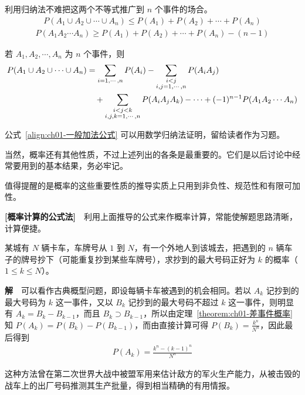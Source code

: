 \documentclass[../../main.tex]{subfiles}
\begin{document}
利用归纳法不难把这两个不等式推广到 $n$ 个事件的场合。
\begin{align*}
P(A_1\cup A_2\cup\cdots\cup A_n)\leqslant P(A_1)+P(A_2)+\cdots+P(A_n)
\end{align*}
\begin{align*}
P(A_1A_2\cdots A_n)\geqslant P(A_1)+P(A_2)+\cdots+P(A_n)-(n-1)
\end{align*}

\begin{theorem}[一般加法公式]\label{theorem:ch01-一般加法公式}
若 $A_1,A_2,\cdots,A_n$ 为 $n$ 个事件，则
\begin{align}
P(A_1\cup A_2\cup\cdots\cup A_n)&=\sum_{i=1,\cdots,n}P(A_i)-\sum_{\substack{i<j\\i,j=1,\cdots,n}}P(A_iA_j)\notag\\
&\quad+\sum_{\substack{i<j<k\\i,j,k=1,\cdots,n}}P(A_iA_jA_k)-\cdots+(-1)^{n-1}P(A_1A_2\cdots A_n)\label{align:ch01-一般加法公式}
\end{align}
\end{theorem}

公式~\eqref{align:ch01-一般加法公式} 可以用数学归纳法证明，留给读者作为习题。

当然，概率还有其他性质，不过上述列出的各条是最重要的。它们是以后讨论中经常要用到的基本结果，务必牢记。

值得提醒的是概率的这些重要性质的推导实质上只用到非负性、规范性和有限可加性。

\textbf{[概率计算的公式法]}~~利用上面推导的公式来作概率计算，常能使解题思路清晰，计算便捷。

\begin{example}[最大车牌号]\label{example:ch01-最大车牌号}
某城有 $N$ 辆卡车，车牌号从 $1$ 到 $N$，有一个外地人到该城去，把遇到的 $n$ 辆车子的牌号抄下（可能重复抄到某些车牌号），求抄到的最大号码正好为 $k$ 的概率（$1\leqslant k\leqslant N$）。

\textbf{解}~~可以看作古典概型问题，即设每辆卡车被遇到的机会相同。若以 $A_k$ 记抄到的最大号码为 $k$ 这一事件，又以 $B_k$ 记抄到的最大号码不超过 $k$ 这一事件，则明显有 $A_k=B_k-B_{k-1}$，而且 $B_k\supset B_{k-1}$，所以由定理~\ref{theorem:ch01-差事件概率} 知 $P(A_k)=P(B_k)-P(B_{k-1})$，而由直接计算可得 $P(B_k)=\frac{k^n}{N^n}$，因此最后得到
\begin{align*}
P(A_k)=\frac{k^n-(k-1)^n}{N^n}
\end{align*}

这种方法曾在第二次世界大战中被盟军用来估计敌方的军火生产能力，从被击毁的战车上的出厂号码推测其生产批量，得到相当精确的有用情报。
\end{example}
\end{document}
